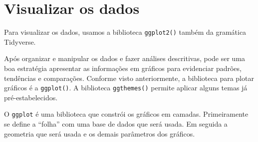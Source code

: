 \documentclass[
  brazil,
]{book}
\newenvironment{Shaded}{\begin{snugshade}}{\end{snugshade}}
\newcommand{\CommentTok}[1]{\textcolor[rgb]{0.56,0.35,0.01}{\textit{#1}}}
\newcommand{\DataTypeTok}[1]{\textcolor[rgb]{0.13,0.29,0.53}{#1}}
\newcommand{\DecValTok}[1]{\textcolor[rgb]{0.00,0.00,0.81}{#1}}
\newcommand{\KeywordTok}[1]{\textcolor[rgb]{0.13,0.29,0.53}{\textbf{#1}}}
\newcommand{\NormalTok}[1]{#1}
\newcommand{\OperatorTok}[1]{\textcolor[rgb]{0.81,0.36,0.00}{\textbf{#1}}}
\newcommand{\StringTok}[1]{\textcolor[rgb]{0.31,0.60,0.02}{#1}}
\begin{document}
\begin{Shaded}
\end{Shaded}

\hypertarget{visualizar-os-dados}{%
\chapter{Visualizar os dados}\label{visualizar-os-dados}}

Para visualizar os dados, usamos a biblioteca \texttt{ggplot2()} também da gramática Tidyverse.

Após organizar e manipular os dados e fazer análises descritivas, pode ser uma boa estratégia apresentar as informações em gráficos para evidenciar padrões, tendências e comparações. Conforme visto anteriormente, a biblioteca para plotar gráficos é a \texttt{ggplot()}. A biblioteca \texttt{ggthemes()} permite aplicar alguns temas já pré-estabelecidos.

O \texttt{ggplot} é uma biblioteca que constrói os gráficos em camadas. Primeiramente se define a ``folha'' com uma base de dados que será usada. Em seguida a geometria que será usada e os demais parâmetros dos gráficos.
\end{document}

